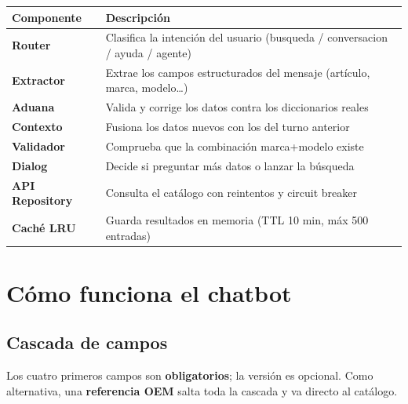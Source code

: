 \documentclass[12pt, a4paper]{article}
\begin{document}
\begin{center}
\renewcommand{\arraystretch}{1.25}
\begin{tabularx}{\textwidth}{>{\bfseries}lX}
\toprule
Componente & Descripción \\
\midrule
Router         & Clasifica la intención del usuario (busqueda / conversacion / ayuda / agente) \\
Extractor      & Extrae los campos estructurados del mensaje (artículo, marca, modelo\ldots) \\
Aduana         & Valida y corrige los datos contra los diccionarios reales \\
Contexto       & Fusiona los datos nuevos con los del turno anterior \\
Validador      & Comprueba que la combinación marca+modelo existe \\
Dialog         & Decide si preguntar más datos o lanzar la búsqueda \\
API Repository & Consulta el catálogo con reintentos y circuit breaker \\
Caché LRU      & Guarda resultados en memoria (TTL 10 min, máx 500 entradas) \\
\bottomrule
\end{tabularx}
\end{center}

\section{Cómo funciona el chatbot}

\subsection{Cascada de campos}

Los cuatro primeros campos son \textbf{obligatorios}; la versión es opcional. Como alternativa, una \textbf{referencia OEM} salta toda la cascada y va directo al catálogo.
\end{document}
